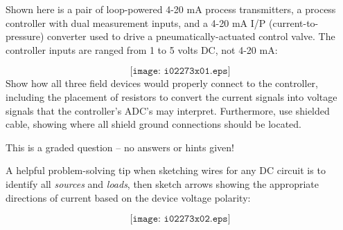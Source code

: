 

Shown here is a pair of loop-powered 4-20 mA process transmitters, a process controller with dual measurement inputs, and a 4-20 mA I/P (current-to-pressure) converter used to drive a pneumatically-actuated control valve.  The controller inputs are ranged from 1 to 5 volts DC, not 4-20 mA:

$$\texttt{[image: i02273x01.eps]}$$
Show how all three field devices would properly connect to the controller, including the placement of resistors to convert the current signals into voltage signals that the controller's ADC's may interpret.  Furthermore, use shielded cable, showing where all shield ground connections should be located.

\vfil 

\eject






This is a graded question -- no answers or hints given!







A helpful problem-solving tip when sketching wires for any DC circuit is to identify all {\it sources} and {\it loads}, then sketch arrows showing the appropriate directions of current based on the device voltage polarity:

$$\texttt{[image: i02273x02.eps]}$$




